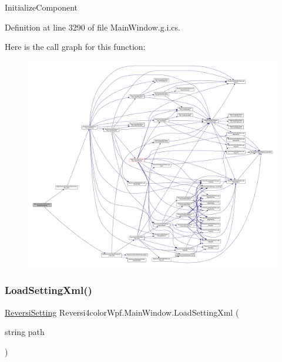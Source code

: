 Initialize\+Component 



Definition at line 3290 of file Main\+Window.\+g.\+i.\+cs.

Here is the call graph for this function\+:
\nopagebreak
\begin{figure}[H]
\begin{center}
\leavevmode
\includegraphics[width=350pt]{class_reversi4color_wpf_1_1_main_window_a20f84946e71f327820f3ccbefca1f3a0_cgraph}
\end{center}
\end{figure}
\mbox{\label{class_reversi4color_wpf_1_1_main_window_a41e46cabc1f4610366e617af1ad95805}} 
\subsubsection{\texorpdfstring{Load\+Setting\+Xml()}{LoadSettingXml()}}
{\footnotesize\ttfamily \hyperlink{class_reversi4color_wpf_1_1_reversi_setting}{Reversi\+Setting} Reversi4color\+Wpf.\+Main\+Window.\+Load\+Setting\+Xml (\begin{DoxyParamCaption}\item[{string}]{path }\end{DoxyParamCaption})}



